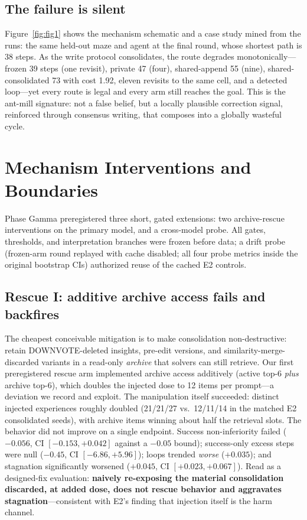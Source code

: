 \documentclass[11pt]{article}
\begin{document}
\subsection{The failure is silent}

Figure~\ref{fig:fig1} shows the mechanism schematic and a case study mined from the runs: the
same held-out maze and agent at the final round, whose shortest path is 38 steps. As the write
protocol consolidates, the route degrades monotonically---frozen 39 steps (one revisit),
private 47 (four), shared-append 55 (nine), shared-consolidated 73 with cost 1.92, eleven
revisits to the same cell, and a detected loop---yet every route is legal and every arm still
reaches the goal. This is the ant-mill signature: not a false belief, but a locally plausible
correction signal, reinforced through consensus writing, that composes into a globally
wasteful cycle.

\section{Mechanism Interventions and Boundaries}\label{sec:gamma}

Phase Gamma preregistered three short, gated extensions: two archive-rescue interventions on
the primary model, and a cross-model probe. All gates, thresholds, and interpretation branches
were frozen before data; a drift probe (frozen-arm round replayed with cache disabled; all four
probe metrics inside the original bootstrap CIs) authorized reuse of the cached E2 controls.

\subsection{Rescue I: additive archive access fails and backfires}

The cheapest conceivable mitigation is to make consolidation non-destructive: retain
DOWNVOTE-deleted insights, pre-edit versions, and similarity-merge-discarded variants in a
read-only \emph{archive} that solvers can still retrieve. Our first preregistered rescue arm
implemented archive access additively (active top-6 \emph{plus} archive top-6), which doubles
the injected dose to 12 items per prompt---a deviation we record and exploit. The manipulation
itself succeeded: distinct injected experiences roughly doubled (21/21/27 vs.\ 12/11/14 in the
matched E2 consolidated seeds), with archive items winning about half the retrieval slots. The
behavior did not improve on a single endpoint. Success non-inferiority failed
($-0.056$, CI $[-0.153, +0.042]$ against a $-0.05$ bound); success-only excess steps were null
($-0.45$, CI $[-6.86, +5.96]$); loops trended \emph{worse} ($+0.035$); and stagnation
significantly worsened ($+0.045$, CI $[+0.023, +0.067]$). Read as a designed-fix evaluation:
\textbf{naively re-exposing the material consolidation discarded, at added dose, does not
rescue behavior and aggravates stagnation}---consistent with E2's finding that injection
itself is the harm channel.
\end{document}

